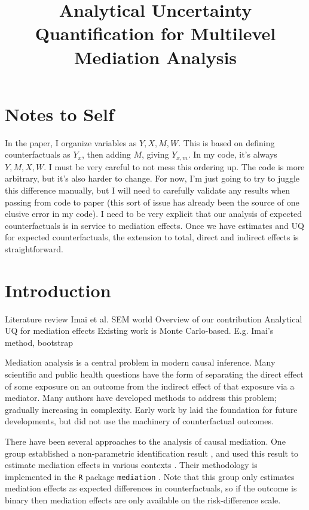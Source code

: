\documentclass{article}
\title{Analytical Uncertainty Quantification for Multilevel Mediation Analysis}
\begin{document}
\maketitle
\section{Notes to Self}
\begin{outline}
    \1 In the paper, I organize variables as $Y, X, M, W$. This is based on defining counterfactuals as $Y_x$, then adding $M$, giving $Y_{x, m}$. In my code, it's always $Y, M, X, W$. I must be very careful to not mess this ordering up. The code is more arbitrary, but it's also harder to change. For now, I'm just going to try to juggle this difference manually, but I will need to carefully validate any results when passing from code to paper (this sort of issue has already been the source of one elusive error in my code).
    \1 I need to be very explicit that our analysis of expected counterfactuals is in service to mediation effects. Once we have estimates and UQ for expected counterfactuals, the extension to total, direct and indirect effects is straightforward.
\end{outline}



\section{Introduction}



\begin{outline}
    \1 Literature review
        \2 \citeauthor{Sam23}
        \2 Imai et al.
        \2 SEM world
    \1 Overview of our contribution
        \2 Analytical UQ for mediation effects
        \2 Existing work is Monte Carlo-based. E.g. Imai's method, bootstrap
\end{outline}

Mediation analysis is a central problem in modern causal inference. Many scientific and public health questions have the form of separating the direct effect of some exposure on an outcome from the indirect effect of that exposure via a mediator. Many authors have developed methods to address this problem; gradually increasing in complexity. Early work by \citet{Bar86} laid the foundation for future developments, but did not use the machinery of counterfactual outcomes. 

There have been several approaches to the analysis of causal mediation. One group established a non-parametric identification result \citep{Ima10II}, and used this result to estimate mediation effects in various contexts \citep{Ima10I, Ima11}. Their methodology is implemented in the \texttt{R} package \texttt{mediation} \citep{Tin14}. Note that this group only estimates mediation effects as expected differences in counterfactuals, so if the outcome is binary then mediation effects are only available on the risk-difference scale.
\end{document}
